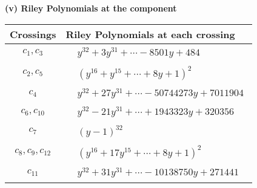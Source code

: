 \documentclass[1p]{elsarticle_modified}
\theoremstyle{definition}
\begin{document}
\newpage\renewcommand{\arraystretch}{1}
\flushleft \textbf{(v) Riley Polynomials at the component}\newline \\
\begin{tabular}{m{50pt}|m{274pt}}
Crossings & \hspace{64pt}Riley Polynomials at each crossing \\
\hline $$\begin{aligned}c_{1},c_{3}\end{aligned}$$&$\begin{aligned}
&y^{32}+3 y^{31}+\cdots-8501 y+484
\end{aligned}$\\
\hline $$\begin{aligned}c_{2},c_{5}\end{aligned}$$&$\begin{aligned}
&(y^{16}+y^{15}+\cdots+8 y+1)^{2}
\end{aligned}$\\
\hline $$\begin{aligned}c_{4}\end{aligned}$$&$\begin{aligned}
&y^{32}+27 y^{31}+\cdots-50744273 y+7011904
\end{aligned}$\\
\hline $$\begin{aligned}c_{6},c_{10}\end{aligned}$$&$\begin{aligned}
&y^{32}-21 y^{31}+\cdots+1943323 y+320356
\end{aligned}$\\
\hline $$\begin{aligned}c_{7}\end{aligned}$$&$\begin{aligned}
&(y-1)^{32}
\end{aligned}$\\
\hline $$\begin{aligned}c_{8},c_{9},c_{12}\end{aligned}$$&$\begin{aligned}
&(y^{16}+17 y^{15}+\cdots+8 y+1)^{2}
\end{aligned}$\\
\hline $$\begin{aligned}c_{11}\end{aligned}$$&$\begin{aligned}
&y^{32}+31 y^{31}+\cdots-10138750 y+271441
\end{aligned}$\\
\hline
\end{tabular}\\~\\
\end{document}
